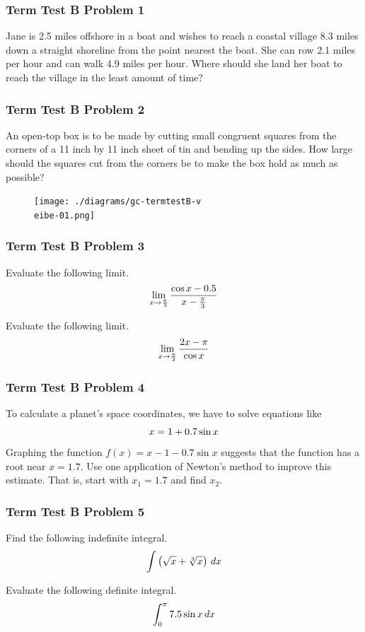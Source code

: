 \documentclass[xcolor=dvipsnames]{beamer}
\newcommand{\eibe}{1}
\newcommand{\reeq}{2.5}
\newcommand{\aeza}{8.3}
\newcommand{\emah}{2.1}
\newcommand{\biet}{4.9}
\newcommand{\hohq}{Jane}
\newcommand{\wili}{She}
\newcommand{\ahhi}{she}
\newcommand{\bohh}{her}
\newcommand{\kahr}{\lim_{x\rightarrow\frac{\pi}{2}}\frac{2x-\pi}{\cos{}x}}
\newcommand{\ooce}{\int_{0}^{\pi}7.5\sin{}x\,dx}
\newcommand{\usax}{11}
\newcommand{\eiri}{\lim_{x\rightarrow\frac{\pi}{3}}\frac{\cos{}x-0.5}{x-\frac{\pi}{3}}}
\newcommand{\ohdo}{0.7}
\newcommand{\eigh}{1.7}
\newcommand{\hahs}{\int\left(\sqrt{x}+\sqrt[3]{x}\right)\,dx}
\begin{document}
\begin{frame}
  \frametitle{Term Test B Problem 1} 
  {\hohq} is {\reeq} miles offshore in a boat and wishes to reach a
  coastal village {\aeza} miles down a straight shoreline from the
  point nearest the boat. {\wili} can row {\emah} miles per hour and
  can walk {\biet} miles per hour. Where should {\ahhi} land {\bohh}
  boat to reach the village in the least amount of time?
\end{frame}

\begin{frame}
  \frametitle{Term Test B Problem 2}
  An open-top box is to be made by cutting small congruent squares
  from the corners of a {\usax} inch by {\usax} inch sheet of tin and
  bending up the sides. How large should the squares cut from the
  corners be to make the box hold as much as possible?
\begin{figure}[h]
  \texttt{[image: ./diagrams/gc-termtestB-v\\eibe-01.png]}
\end{figure}
\end{frame}

\begin{frame}
  \frametitle{Term Test B Problem 3}
Evaluate the following limit.
\begin{equation}
  \label{eq:ahkisoav} \eiri\notag
\end{equation}

Evaluate the following limit.
\begin{equation}
  \label{eq:voolohqu} \kahr\notag
\end{equation}
\end{frame}

\begin{frame}
  \frametitle{Term Test B Problem 4}
To calculate a planet's space
coordinates, we have to solve equations like 
\begin{equation}
  \label{eq:aathieyi}
  x=1+{\ohdo}\sin{}x\notag
\end{equation}
Graphing the function $f(x)=x-1-{\ohdo}\sin{}x$
suggests that the function has a root near
$x={\eigh}$. Use one application of Newton's
method to improve this estimate. That is,
start with $x_{1}={\eigh}$ and find $x_{2}$.
\end{frame}

\begin{frame}
  \frametitle{Term Test B Problem 5}
Find the following indefinite
integral. 
\begin{equation}
  \label{eq:xieveimo}
  \hahs\notag
\end{equation}

Evaluate the following definite
integral.
\begin{equation}
  \label{eq:moubeing}
  \ooce\notag
\end{equation}
\end{frame}
\end{document}
